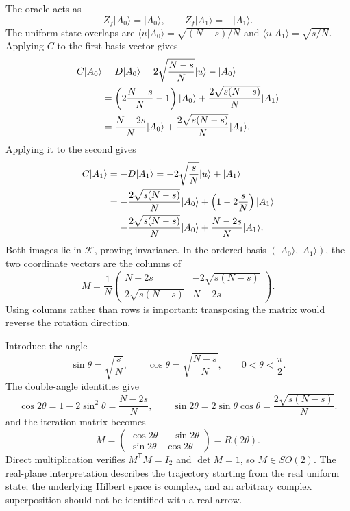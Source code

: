 \documentclass[11pt,oneside,openany]{book}
\providecommand{\ket}{}
\renewcommand{\ket}[1]{\lvert #1\rangle}
\providecommand{\braket}{}
\renewcommand{\braket}[2]{\langle #1\vert #2\rangle}
\theoremstyle{definition}
\begin{document}
The oracle acts as
\begin{equation}
 Z_f\ket{A_0}=\ket{A_0},\qquad Z_f\ket{A_1}=-\ket{A_1}.
 \label{eq:search-z-two}
\end{equation}
The uniform-state overlaps are $\braket u{A_0}=\sqrt{(N-s)/N}$ and $\braket u{A_1}=\sqrt{s/N}$. Applying $C$ to the first basis vector gives
\begin{align}
 C\ket{A_0}
 &=D\ket{A_0}
   =2\sqrt{\frac{N-s}{N}}\ket u-\ket{A_0}\notag\\
 &=\left(2\frac{N-s}{N}-1\right)\ket{A_0}
   +\frac{2\sqrt{s(N-s)}}N\ket{A_1}\notag\\
 &=\frac{N-2s}{N}\ket{A_0}
   +\frac{2\sqrt{s(N-s)}}N\ket{A_1}.
 \label{eq:search-first-column}
\end{align}
Applying it to the second gives
\begin{align}
 C\ket{A_1}
 &=-D\ket{A_1}
   =-2\sqrt{\frac sN}\ket u+\ket{A_1}\notag\\
 &=-\frac{2\sqrt{s(N-s)}}N\ket{A_0}
   +\left(1-2\frac sN\right)\ket{A_1}\notag\\
 &=-\frac{2\sqrt{s(N-s)}}N\ket{A_0}
   +\frac{N-2s}{N}\ket{A_1}.
 \label{eq:search-second-column}
\end{align}
Both images lie in $\mathcal K$, proving invariance. In the ordered basis $(\ket{A_0},\ket{A_1})$, the two coordinate vectors are the columns of
\begin{equation}
 M=\frac1N
 \begin{pmatrix}
 N-2s&-2\sqrt{s(N-s)}\\
 2\sqrt{s(N-s)}&N-2s
 \end{pmatrix}.
 \label{eq:search-matrix}
\end{equation}
Using columns rather than rows is important: transposing the matrix would reverse the rotation direction.

Introduce the angle
\begin{equation}
 \sin\theta=\sqrt{\frac sN},\qquad
 \cos\theta=\sqrt{\frac{N-s}{N}},\qquad 0<\theta<\frac\pi2.
 \label{eq:search-theta}
\end{equation}
The double-angle identities give
\begin{equation}
 \cos2\theta=1-2\sin^2\theta=\frac{N-2s}{N},
 \qquad
 \sin2\theta=2\sin\theta\cos\theta=\frac{2\sqrt{s(N-s)}}N.
\end{equation}
and the iteration matrix becomes
\begin{equation}
 M=\begin{pmatrix}\cos2\theta&-\sin2\theta\\
                   \sin2\theta&\cos2\theta\end{pmatrix}
 =R(2\theta).
 \label{eq:search-rotation}
\end{equation}
Direct multiplication verifies $M^{\mathsf T}M=I_2$ and $\det M=1$, so $M\in SO(2)$. The real-plane interpretation describes the trajectory starting from the real uniform state; the underlying Hilbert space is complex, and an arbitrary complex superposition should not be identified with a real arrow.
\end{document}
